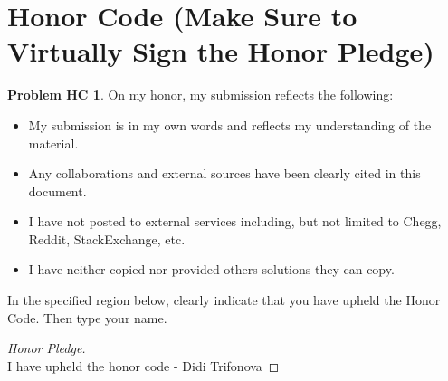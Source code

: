 \documentclass[11pt]{article}
\theoremstyle{definition}
\theoremstyle{definition}
\newtheorem*{requiredHC}{Problem HC}
\theoremstyle{definition}
\begin{document}
\section*{Honor Code (Make Sure to Virtually Sign the Honor Pledge)} 
\hypertarget{HonorCode}{}

\begin{requiredHC}
On my honor, my submission reflects the following:
\begin{itemize}
\item My submission is in my own words and reflects my understanding of the material.
\item Any collaborations and external sources have been clearly cited in this document.
\item I have not posted to external services including, but not limited to Chegg, Reddit, StackExchange, etc.
\item I have neither copied nor provided others solutions they can copy.
\end{itemize}

\noindent In the specified region below, clearly indicate that you have upheld the Honor Code. Then type your name. 
\end{requiredHC}

\begin{proof}[Honor Pledge] $ $\\
I have upheld the honor code - Didi Trifonova
\end{proof}


\newpage
\end{document}

